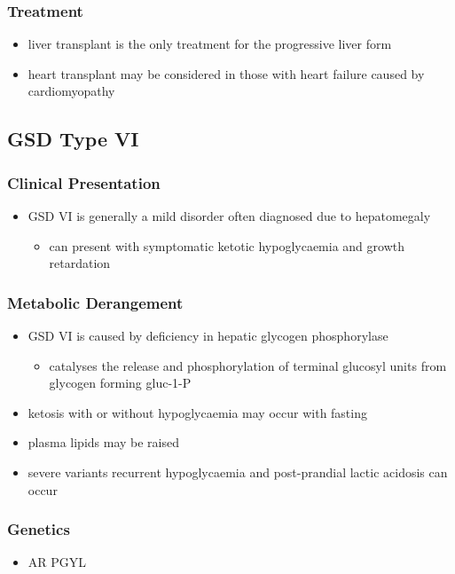 \documentclass{scrartcl}
\begin{document}
\subsubsection{Treatment}
\label{sec:orgec5a656}
\begin{itemize}
\item liver transplant is the only treatment for the progressive liver form
\item heart transplant may be considered in those with heart failure caused by cardiomyopathy
\end{itemize}
\subsection{GSD Type VI}
\label{sec:org0d57298}
\subsubsection{Clinical Presentation}
\label{sec:orgf4f0ff4}
\begin{itemize}
\item GSD VI is generally a mild disorder often diagnosed due to hepatomegaly
\begin{itemize}
\item can present with symptomatic ketotic hypoglycaemia and growth retardation
\end{itemize}
\end{itemize}
\subsubsection{Metabolic Derangement}
\label{sec:org71006a4}
\begin{itemize}
\item GSD VI is caused by deficiency in hepatic glycogen phosphorylase
\begin{itemize}
\item catalyses the release and phosphorylation of terminal glucosyl units
from glycogen forming gluc-1-P
\end{itemize}
\item ketosis with or without hypoglycaemia may occur with fasting
\item plasma lipids may be raised
\item severe variants recurrent hypoglycaemia and post-prandial lactic
acidosis can occur
\end{itemize}
\subsubsection{Genetics}
\label{sec:orgd55bcea}
\begin{itemize}
\item AR PGYL
\end{itemize}
\end{document}

